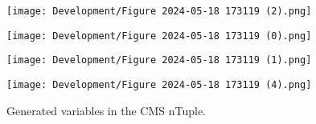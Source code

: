 \begin{figure}[H]
    \centering
    \begin{minipage}{0.45\textwidth}
        \centering
        \texttt{[image: Development/Figure 2024-05-18 173119 (2).png]} %
        
        \label{fig:figure1}
    \end{minipage}
    \hfill
    \begin{minipage}{0.45\textwidth}
        \centering
        \texttt{[image: Development/Figure 2024-05-18 173119 (0).png]} %
        
        \label{fig:figure2}
    \end{minipage}

    \vspace{1em} %

    \begin{minipage}{0.45\textwidth}
        \centering
        \texttt{[image: Development/Figure 2024-05-18 173119 (1).png]} %
        
        \label{fig:figure3}
    \end{minipage}
    \hfill
    \begin{minipage}{0.45\textwidth}
        \centering
        \texttt{[image: Development/Figure 2024-05-18 173119 (4).png]} %
        
        \label{fig:figure4}
    \end{minipage}
    \caption{Generated variables in the CMS nTuple.}
\end{figure}
